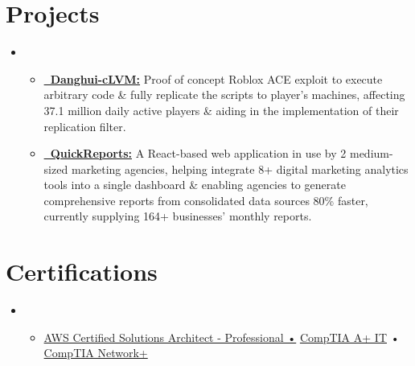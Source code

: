 \documentclass[letterpaper,11pt]{article}
\newcommand{\cvitem}[1]{
  \item\small{
    {#1\vspace{-2pt}}
  }
}
\newcommand{\cvheadingstart}{\begin{itemize}[leftmargin=0in, label={}]}
\newcommand{\cvheadingend}{\end{itemize}}
\newcommand{\cvitemstart}{\begin{itemize}\justifying}
\newcommand{\cvitemend}{\end{itemize}\vspace{-5pt}}
\begin{document}
\section{Projects}
\cvheadingstart
\item
\cvitemstart
  \cvitem{\textbf{\href{https://github.com/AmirAgassi/Danghui-LVM}{\faGithub \ Danghui-cLVM:}} Proof of concept Roblox ACE exploit to execute arbitrary code \& fully replicate the scripts to player's machines, affecting 37.1 million daily active players \& aiding in the implementation of their replication filter.}
  \vspace{0pt}
  \cvitem{\textbf{\href{https://quickreports.me}{\faChartBar \ QuickReports:}} A React-based web application in use by 2 medium-sized marketing agencies, helping integrate 8+ digital marketing analytics tools into a single dashboard \& enabling agencies to generate comprehensive reports from consolidated data sources 80\% faster, currently supplying 164+ businesses' monthly reports.}
  \vspace{6pt}
\cvitemend
\cvheadingend


\section{Certifications}
\cvheadingstart
\item
\cvitemstart
  \cvitem{\href{https://cp.certmetrics.com/amazon/en/public/verify/credential/2LC36B3CWM411J3K}{AWS Certified Solutions Architect - Professional •} \href{https://www.certmetrics.com/comptia/public/verification.aspx/}{CompTIA A+ IT}}• \href{https://www.certmetrics.com/comptia/public/verification.aspx/}{CompTIA Network+}
\cvitemend
\cvheadingend
\end{document}
